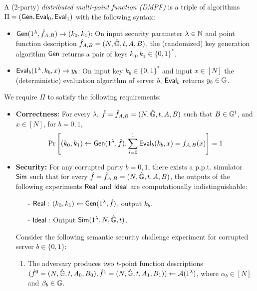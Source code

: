 \begin{definition}\label{def:dmpf}
  A 
  (2-party)
  \emph{distributed multi-point function (DMPF)}
  is a triple of algorithms %
  $\Pi=({\sf Gen},{\sf Eval}_0,{\sf Eval}_1)$
  with the following syntax: 
  \begin{itemize}
      \item ${\sf Gen}(1^\lambda,\hat{f}_{A,B})\rightarrow (k_0,k_1)$: On input security parameter $\lambda\in\mathbb{N}$ and point function description $\hat{f}_{A,B}=(N,\hat{\mathbb{G}},t,A,B)$, the (randomized) key generation algorithm ${\sf Gen}$ returns a pair of keys $k_0,k_1\in\{0,1\}^*$. %
      \item ${\sf Eval}_b(1^\lambda, k_b,x)\rightarrow y_b$: On input key $k_b\in\{0,1\}^*$ and input $x\in[N]$ the (deterministic) evaluation algorithm of server $b$, ${\sf Eval}_b$ returns $y_b\in\mathbb{G}$.
  \end{itemize}
  We require $\Pi$ to satisfy the following requirements:
  \begin{itemize}
      \item \textbf{Correctness:} For every $\lambda$, $\hat{f}=\hat{f}_{A,B}=(N,\hat{\mathbb{G}},t,A,B)$ such that $B\in\mathbb{G}^t$, and $x\in[N]$, for $b=0,1$,
      $$\Pr\left[(k_0,k_1)\leftarrow{\sf Gen}(1^\lambda,\hat{f}), \sum_{i=0}^{1}{\sf Eval}_b(k_b,x)=f_{A,B}(x)\right]=1$$
      \item \textbf{Security: }For any corrupted party $b = 0,1$, there exists a p.p.t. simulator $\sf Sim$ such that for every $\hat{f} = \hat{f}_{A,B} = (N,\hat{\mathbb{G}},t,A,B)$, the outputs of the following experiments $\sf Real$ and $\sf Ideal$ are computationally indistinguishable: 
      \begin{itemize}
          \item[-]${\sf Real}:\,(k_0,k_1)\gets {\sf Gen}(1^\lambda, \hat{f})$, output $k_b$. 
          \item[-]$\sf Ideal:$ Output ${\sf Sim}(1^\lambda, N,\hat{\mathbb{G}},t)$. 
      \end{itemize}
      \iffalse
      Consider the following semantic security challenge experiment for corrupted server $b\in\{0,1\}$:
      \begin{enumerate}
          \item The adversary produces two $t$-point function descriptions $(\hat{f}^0=(N,\hat{\mathbb{G}},t,A_0,B_0),\hat{f}^1=(N,\hat{\mathbb{G}},t,A_1,B_1))\leftarrow\mathcal{A}(1^\lambda)$, where $\alpha_b\in[N]$ and $\beta_b\in\mathbb{G}$.

\end{enumerate}
\end{itemize}
\end{definition}
